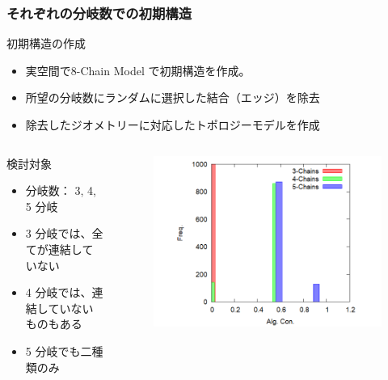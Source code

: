 \documentclass[11pt, dvipdfmx]{beamer}
\begin{document}
\begin{frame}
\frametitle{それぞれの分岐数での初期構造}

\begin{exampleblock}{初期構造の作成}
	\begin{itemize}
	\item
	\alert{実空間}で8-Chain Model で初期構造を作成。
	\item
	所望の分岐数に\alert{ランダム}に選択した\alert{結合（エッジ）を除去}
	\item
	除去したジオメトリーに対応した\alert{トポロジーモデル}を作成
	\end{itemize}
\end{exampleblock}

\begin{columns}[totalwidth=\linewidth]
\begin{block}{検討対象}
\begin{itemize}
\item
分岐数： 3, 4, 5 分岐
\item
3 分岐では、全てが連結していない
\item
4 分岐では、連結していないものもある
\item
5 分岐でも二種類のみ
\end{itemize}
\end{block}
\begin{figure}
\includegraphics[width=\columnwidth]{./fig/Histgram2.png}
\end{figure}
\end{columns}

\end{frame}
\end{document}
